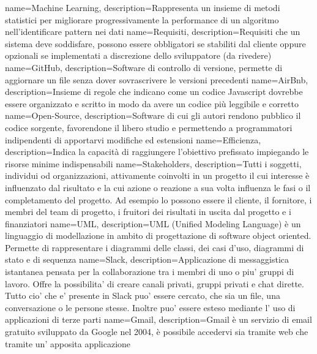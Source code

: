 {
    name=Machine Learning,
    description={Rappresenta un insieme di metodi statistici per migliorare progressivamente la performance di un algoritmo nell'identificare pattern nei dati}
}
{
    name=Requisiti,
    description={Requisiti che un sistema deve soddisfare, possono essere obbligatori se stabiliti dal cliente oppure opzionali se implementati a discrezione dello sviluppatore (da rivedere)}
}
{
    name=GitHub,
    description={Software di controllo di versione, permette di aggiornare un file senza dover sovrascrivere le versioni precedenti}
}
{
    name=AirBnb,
    description={Insieme di regole che indicano come un codice Javascript dovrebbe essere organizzato e scritto in modo da avere un codice più leggibile e corretto}
}
{
    name=Open-Source,
    description={Software di cui gli autori rendono pubblico il codice sorgente, favorendone il libero studio e permettendo a programmatori indipendenti di apportarvi modifiche ed estensioni}
}
{
    name=Efficienza,
    description={Indica la capacità di raggiungere l'obiettivo prefissato impiegando le risorse minime indispensabili}
}
{
    name=Stakeholders,
    description={Tutti i soggetti, individui od organizzazioni, attivamente coinvolti in un progetto il cui interesse è influenzato dal risultato e la cui azione o reazione a sua volta influenza le fasi o il completamento del progetto. Ad esempio lo possono essere il cliente, il fornitore, i membri del team di progetto, i fruitori dei risultati in uscita dal progetto e i finanziatori}
}
{
    name=UML,
    description={UML (Unified Modeling Language) è un linguaggio di modellazione in ambito di progettazione di software object oriented. Permette di rappresentare i diagrammi delle classi, dei casi d'uso, diagrammi di stato e di sequenza}
}
{
    name=Slack,
    description={Applicazione di messaggistica istantanea pensata per la collaborazione tra i membri di uno o piu' gruppi di lavoro. Offre la possibilita' di creare canali privati, gruppi privati e chat dirette. Tutto cio' che e' presente in Slack puo' essere cercato, che sia un file, una conversazione o le persone stesse. Inoltre puo' essere esteso mediante l' uso di applicazioni di terze parti}
}
{
    name=Gmail,
    description={Gmail è un servizio di email gratuito sviluppato da Google nel 2004, è possibile accedervi sia tramite web che tramite un' apposita applicazione}
}
